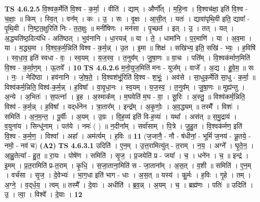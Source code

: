 \documentclass[17pt]{extarticle}
\begin{document}
                  \newline
                                \textbf{ TS 4.6.2.5} \newline
                  वि॒श्वक॒र्मेति॑ वि॒श्व - क॒र्मा॒ । वीति॑ । द्याम् । और्णो᳚त् । म॒हि॒ना । वि॒श्वच॑क्षा॒ इति॑ वि॒श्व - च॒क्षाः॒ ॥ किम् । स्वि॒त् । वन᳚म् । कः । उ॒ । सः । वृ॒क्षः । आ॒सी॒त् । यतः॑ । द्यावा॑पृथि॒वी इति॒ द्यावा᳚ - पृ॒थि॒वी । नि॒ष्ट॒त॒क्षुरिति॑ निः - त॒त॒क्षुः ॥ मनी॑षिणः । मन॑सा । पृ॒च्छत॑ । इत् । उ॒ । तत् । यत् । अ॒द्ध्यति॑ष्ठ॒दित्य॑धि - अति॑ष्ठत् । भुव॑नानि । धा॒रयन्न्॑ ॥ या । ते॒ । धामा॑नि । प॒र॒माणि॑ । या । अ॒व॒मा । या । म॒द्ध्य॒मा । वि॒श्व॒क॒र्म॒न्निति॑ विश्व - क॒र्म॒न्न् । उ॒त । इ॒मा ॥ शिक्ष॑ । सखि॑भ्य॒ इति॒ सखि॑ - भ्यः॒ । ह॒विषि॑ । स्व॒धा॒व॒ इति॑ स्वधा - वः॒ । स्व॒यम् । य॒ज॒स्व॒ । त॒नुव᳚म् । जु॒षा॒णः ॥ वा॒चः । पति᳚म् । वि॒श्वक॑र्माण॒मिति॑ वि॒श्व - क॒र्मा॒ण॒म् । ऊ॒तये᳚ । \textbf{  10} \newline
                  \newline
                                \textbf{ TS 4.6.2.6} \newline
                  म॒नो॒युज॒मिति॑ मनः - युज᳚म् । वाजे᳚ । अ॒द्य । हु॒वे॒म॒ ॥ सः । नः॒ । नेदि॑ष्ठा । हव॑नानि । जो॒ष॒ते॒ । वि॒श्वश॑भूं॒रिति॑ वि॒श्व - श॒भूंः॒ । अव॑से । सा॒धुक॒र्मेति॑ सा॒धु - क॒र्मा॒ ॥ विश्व॑कर्म॒न्निति॒ विश्व॑-क॒र्म॒न्न् । ह॒विषा᳚ । वा॒वृ॒धा॒नः । स्व॒यम् । य॒ज॒स्व॒ । त॒नुव᳚म् । जु॒षा॒णः ॥ मुह्य॑न्तु । अ॒न्ये । अ॒भितः॑ । स॒पत्नाः᳚ । इ॒ह । अ॒स्माक᳚म् । म॒घवेति॑ म॒घ - वा॒ । सू॒रिः । अ॒स्तु॒ ॥ विश्व॑कर्म॒न्निति॒ विश्व॑ - क॒र्म॒न्न् । ह॒विषा᳚ । वद्‌र्ध॑नेन । त्रा॒तार᳚म् । इन्द्र᳚म् । अ॒कृ॒णोः॒ । अ॒व॒द्ध्यम् ॥ तस्मै᳚ । विशः॑ । समिति॑ । अ॒न॒म॒न्त॒ । पू॒र्वीः । अ॒यम् । उ॒ग्रः । वि॒ह॒व्य॑ इति॑ वि-ह॒व्यः॑ । यथा᳚ । अस॑त् ॥ स॒मु॒द्राय॑ । व॒युना॑य । सिन्धू॑नाम् । पत॑ये । नमः॑ ( ) ॥ न॒दीना᳚म् । सर्वा॑साम् । पि॒त्रे । जु॒हु॒त । वि॒श्वक॑र्मण॒ इति॑ वि॒श्व - क॒र्म॒ण॒ । विश्वा᳚ । अहा᳚ । अम॑र्त्यम् । ह॒विः ॥ \textbf{  11} \newline
                  \newline
                      (ज॒जानै॒ - नौ - ष॑धीनां॒ - भूमिं॑ ज॒नय॑ - न्नू॒तये॒ - नमो॒ - नव॑ च)  \textbf{(A2)} \newline \newline
                                \textbf{ TS 4.6.3.1} \newline
                  उदिति॑ । ए॒न॒म् । उ॒त्त॒रामित्यु॑त् - त॒राम् । न॒य॒ । अग्ने᳚ । घृ॒ते॒न॒ । आ॒हु॒तेत्या᳚ - हु॒त॒ ॥ रा॒यः । पोषे॑ण । समिति॑ । सृ॒ज॒ । प्र॒जयेति॑ प्र - जया᳚ । च॒ । धने॑न । च॒ ॥ इन्द्र॑ । इ॒मम् । प्र॒त॒रामिति॑ प्र-त॒राम् । कृ॒धि॒ । स॒जा॒ताना॒मिति॑ स - जा॒ताना᳚म् । अ॒स॒त् । व॒शी ॥ समिति॑ । ए॒न॒म् । वर्च॑सा । सृ॒ज॒ । दे॒वेभ्यः॑ । भा॒ग॒धा इति॑ भाग - धाः । अ॒स॒त् ॥ यस्य॑ । कु॒र्मः । ह॒विः । गृ॒हे । तम् । अ॒ग्ने॒ । व॒द्‌र्ध॒य॒ । त्वम् ॥ तस्मै᳚ । दे॒वाः । अधीति॑ । ब्र॒व॒न्न् । अ॒यम् । च॒ । ब्रह्म॑णः । पतिः॑ ॥ उदिति॑ । उ॒ । त्वा॒ । विश्वे᳚ । दे॒वाः । \textbf{  12} \newline
\end{document}

